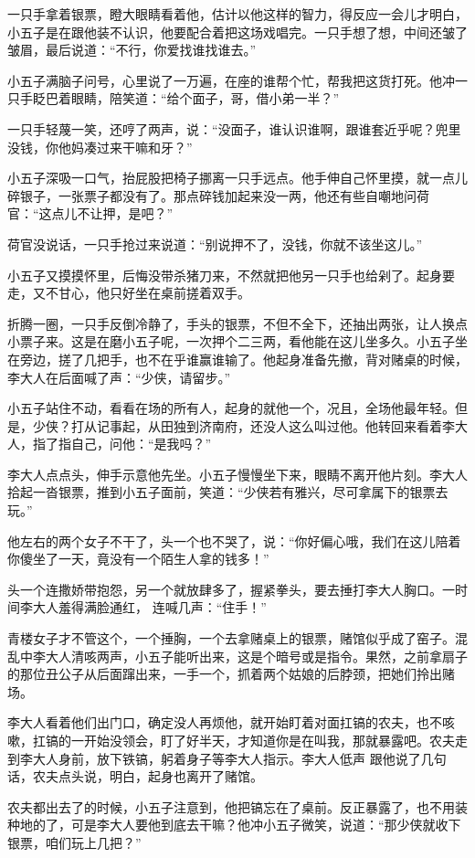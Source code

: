 一只手拿着银票，瞪大眼睛看着他，估计以他这样的智力，得反应一会儿才明白，小五子是在跟他装不认识，他要配合着把这场戏唱完。一只手想了想，中间还皱了皱眉，最后说道：“不行，你爱找谁找谁去。”

小五子满脑子问号，心里说了一万遍，在座的谁帮个忙，帮我把这货打死。他冲一只手眨巴着眼睛，陪笑道：“给个面子，哥，借小弟一半？”

一只手轻蔑一笑，还哼了两声，说：“没面子，谁认识谁啊，跟谁套近乎呢？兜里没钱，你他妈凑过来干嘛和牙？”

小五子深吸一口气，抬屁股把椅子挪离一只手远点。他手伸自己怀里摸，就一点儿碎银子，一张票子都没有了。那点碎钱加起来没一两，他还有些自嘲地问荷官：“这点儿不让押，是吧？”

荷官没说话，一只手抢过来说道：“别说押不了，没钱，你就不该坐这儿。”

小五子又摸摸怀里，后悔没带杀猪刀来，不然就把他另一只手也给剁了。起身要走，又不甘心，他只好坐在桌前搓着双手。

折腾一圈，一只手反倒冷静了，手头的银票，不但不全下，还抽出两张，让人换点小票子来。这是在磨小五子呢，一次押个二三两，看他能在这儿坐多久。小五子坐在旁边，搓了几把手，也不在乎谁赢谁输了。他起身准备先撤，背对赌桌的时候，李大人在后面喊了声：“少侠，请留步。”

小五子站住不动，看看在场的所有人，起身的就他一个，况且，全场他最年轻。但是，少侠？打从记事起，从田独到济南府，还没人这么叫过他。他转回来看着李大人，指了指自己，问他：“是我吗？”

李大人点点头，伸手示意他先坐。小五子慢慢坐下来，眼睛不离开他片刻。李大人拾起一沓银票，推到小五子面前，笑道：“少侠若有雅兴，尽可拿属下的银票去玩。”

他左右的两个女子不干了，头一个也不哭了，说：“你好偏心哦，我们在这儿陪着你傻坐了一天，竟没有一个陌生人拿的钱多！”

头一个连撒娇带抱怨，另一个就放肆多了，握紧拳头，要去捶打李大人胸口。一时间李大人羞得满脸通红，
连喊几声：“住手！”

青楼女子才不管这个，一个捶胸，一个去拿赌桌上的银票，赌馆似乎成了窑子。混乱中李大人清咳两声，小五子能听出来，这是个暗号或是指令。果然，之前拿扇子的那位丑公子从后面蹿出来，一手一个，抓着两个姑娘的后脖颈，把她们拎出赌场。

李大人看着他们出门口，确定没人再烦他，就开始盯着对面扛镐的农夫，也不咳嗽，扛镐的一开始没领会，盯了好半天，才知道你是在叫我，那就暴露吧。农夫走到李大人身前，放下铁镐，躬着身子等李大人指示。李大人低声
跟他说了几句话，农夫点头说，明白，起身也离开了赌馆。

农夫都出去了的时候，小五子注意到，他把镐忘在了桌前。反正暴露了，也不用装种地的了，可是李大人要他到底去干嘛？他冲小五子微笑，说道：“那少侠就收下银票，咱们玩上几把？”

